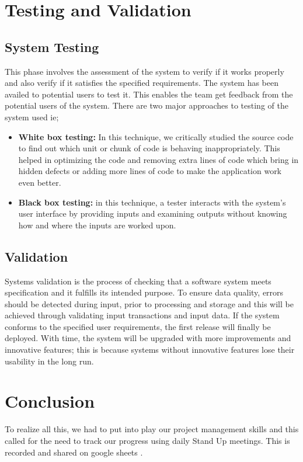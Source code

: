 \section{Testing and Validation}
\subsection{System Testing}
This phase involves the assessment of the system to verify if it works properly and also verify if it satisfies the specified requirements. The system has been availed to potential users to test it. This enables the team get feedback from the potential users of the system.
There are two major approaches to testing of the system used ie;
\begin{itemize}
\item \textbf{White box testing:} In this technique, we critically studied the source code to find out which unit or chunk of code is behaving inappropriately. This helped in optimizing the code and removing extra lines of code which bring in hidden defects or adding more lines of code to make the application work even better.

\item \textbf{Black box testing:} in this technique, a tester interacts with the system’s user interface by providing inputs and examining outputs without knowing how and where the inputs are worked upon. 
\end{itemize}

\subsection{Validation}
Systems validation is the process of checking that a software system meets specification and it fulfills its intended purpose. To ensure data quality, errors should be detected during input, prior to processing and storage and this will be achieved through validating input transactions and input data. If the system conforms to the specified user requirements, the first release will finally be deployed. With time, the system will be upgraded with more improvements and innovative features; this is because systems without innovative features lose their usability in the long run.

\section{Conclusion}
To realize all this, we had to put into play our project management skills and this called for the need to track our progress using daily Stand Up meetings. This is recorded and shared on google sheets \cite{art12}.


